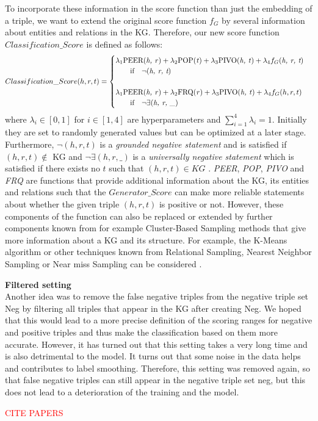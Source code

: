 To incorporate these information in the score function than just the embedding of a triple, we want to extend the original score function $f_G$ by several information about entities and relations in the \ac{KG}.
Therefore, our new score function $Classification\_Score$ is defined as follows:
\begin{equation}
    Classification\_Score(h, r, t)=
    \begin{cases}
         \lambda_1 \text{PEER(\textit{h, r})} + \lambda_2 \text{POP(\textit{t})} + \lambda_3 \text{PIVO(\textit{h, t})} + \lambda_4 f_G(\textit{h, r, t})
         \\ \ \ \ \ \ \ 
         \text{if}\ \ \ \neg(\textit{h, r, t})
         \\ \\
         \lambda_1 \text{PEER(\textit{h, r})} + \lambda_2 \text{FRQ(\textit{r})} + \lambda_3 \text{PIVO(\textit{h, t})} + \lambda_4 f_G(h, r, t)
         \\ \ \ \ \ \ \ 
         \text{if}\ \ \ \neg \exists (\textit{h, r, \_})
         \\
    \end{cases}
\end{equation}
where $\lambda_i \in [0, 1]$ for $i \in [1,4]$  are hyperparameters and $\sum_{i=1}^{4}\lambda_i = 1$.
Initially they are set to randomly generated values but can be optimized at a later stage.
Furthermore, $\neg (h, r, t)$ is a \textit{grounded negative statement} and is satisfied if $(h, r, t) \notin$ \ac{KG} and $\neg\exists(h, r, \_)$ is a \textit{universally negative statement} which is satisfied if there exists no $t$ such that $(h, r, t) \in KG$ \cite{arnaout2020enriching}.
\textit{PEER}, \textit{POP}, \textit{PIVO} and \textit{FRQ} are functions that provide additional information about the \ac{KG}, its entities and relations such that the $Generator\_Score$ can make more reliable statements about whether the given triple $(h, r, t)$ is positive or not.
However, these components of the function can also be replaced or extended by further components known from for example Cluster-Based Sampling methods that give more information about a \ac{KG} and its structure.
For example, the K-Means algorithm \cite{qianunderstanding} or other techniques known from Relational Sampling, Nearest Neighbor Sampling or Near miss Sampling can be considered \cite{kotnis2017analysis}.


\textbf{Filtered setting}\\

Another idea was to remove the false negative triples from the negative triple set Neg by filtering all triples that appear in the KG after creating Neg.
We hoped that this would lead to a more precise definition of the scoring ranges for negative and positive triples and thus make the classification based on them more accurate.
However, it has turned out that this setting takes a very long time and is also detrimental to the model.
It turns out that some noise in the data helps and contributes to label smoothing.
Therefore, this setting was removed again, so that false negative triples can still appear in the negative triple set neg, but this does not lead to a deterioration of the training and the model.

\textcolor{red}{CITE PAPERS}\\

